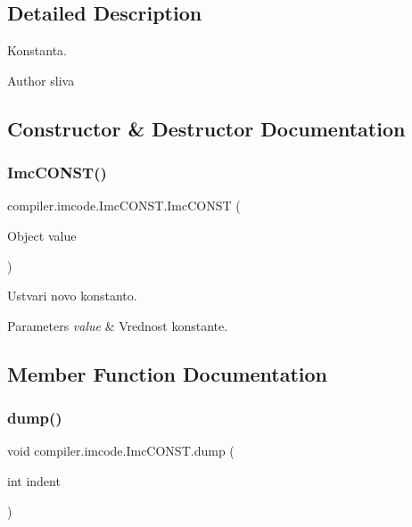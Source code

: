 \subsection{Detailed Description}
Konstanta.

\begin{DoxyAuthor}{Author}
sliva 
\end{DoxyAuthor}


\subsection{Constructor \& Destructor Documentation}
\mbox{\label{classcompiler_1_1imcode_1_1_imc_c_o_n_s_t_aafeb0eaeec69bd90ac8daf20bcc888b4}} 
\subsubsection{\texorpdfstring{Imc\+C\+O\+N\+S\+T()}{ImcCONST()}}
{\footnotesize\ttfamily compiler.\+imcode.\+Imc\+C\+O\+N\+S\+T.\+Imc\+C\+O\+N\+ST (\begin{DoxyParamCaption}\item[{Object}]{value }\end{DoxyParamCaption})}

Ustvari novo konstanto.


\begin{DoxyParams}{Parameters}
{\em value} & Vrednost konstante. \\
\hline
\end{DoxyParams}


\subsection{Member Function Documentation}
\mbox{\label{classcompiler_1_1imcode_1_1_imc_c_o_n_s_t_a8b39fe0c0fc23dd55e8a1b0d61a7c97d}} 
\subsubsection{\texorpdfstring{dump()}{dump()}}
{\footnotesize\ttfamily void compiler.\+imcode.\+Imc\+C\+O\+N\+S\+T.\+dump (\begin{DoxyParamCaption}\item[{int}]{indent }\end{DoxyParamCaption})}

